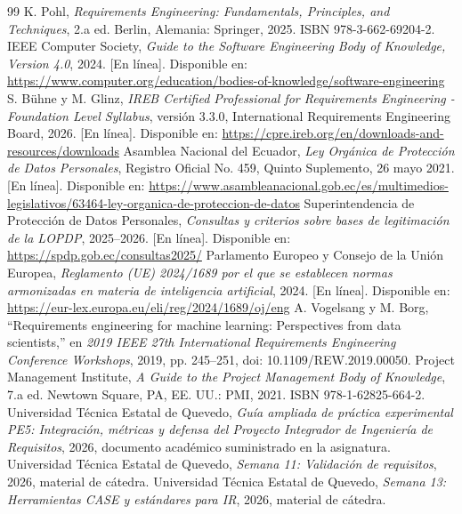 \documentclass[11pt,a4paper]{article}
\begin{document}
\begin{thebibliography}{99}
 K. Pohl, \emph{Requirements Engineering: Fundamentals, Principles, and Techniques}, 2.a ed. Berlin, Alemania: Springer, 2025. ISBN 978-3-662-69204-2.
 IEEE Computer Society, \emph{Guide to the Software Engineering Body of Knowledge, Version 4.0}, 2024. [En línea]. Disponible en: \url{https://www.computer.org/education/bodies-of-knowledge/software-engineering}
 S. Bühne y M. Glinz, \emph{IREB Certified Professional for Requirements Engineering - Foundation Level Syllabus}, versión 3.3.0, International Requirements Engineering Board, 2026. [En línea]. Disponible en: \url{https://cpre.ireb.org/en/downloads-and-resources/downloads}
 Asamblea Nacional del Ecuador, \emph{Ley Orgánica de Protección de Datos Personales}, Registro Oficial No. 459, Quinto Suplemento, 26 mayo 2021. [En línea]. Disponible en: \url{https://www.asambleanacional.gob.ec/es/multimedios-legislativos/63464-ley-organica-de-proteccion-de-datos}
 Superintendencia de Protección de Datos Personales, \emph{Consultas y criterios sobre bases de legitimación de la LOPDP}, 2025--2026. [En línea]. Disponible en: \url{https://spdp.gob.ec/consultas2025/}
 Parlamento Europeo y Consejo de la Unión Europea, \emph{Reglamento (UE) 2024/1689 por el que se establecen normas armonizadas en materia de inteligencia artificial}, 2024. [En línea]. Disponible en: \url{https://eur-lex.europa.eu/eli/reg/2024/1689/oj/eng}
 A. Vogelsang y M. Borg, “Requirements engineering for machine learning: Perspectives from data scientists,” en \emph{2019 IEEE 27th International Requirements Engineering Conference Workshops}, 2019, pp. 245--251, doi: 10.1109/REW.2019.00050.
 Project Management Institute, \emph{A Guide to the Project Management Body of Knowledge}, 7.a ed. Newtown Square, PA, EE. UU.: PMI, 2021. ISBN 978-1-62825-664-2.
 Universidad Técnica Estatal de Quevedo, \emph{Guía ampliada de práctica experimental PE5: Integración, métricas y defensa del Proyecto Integrador de Ingeniería de Requisitos}, 2026, documento académico suministrado en la asignatura.
 Universidad Técnica Estatal de Quevedo, \emph{Semana 11: Validación de requisitos}, 2026, material de cátedra.
 Universidad Técnica Estatal de Quevedo, \emph{Semana 13: Herramientas CASE y estándares para IR}, 2026, material de cátedra.
\end{thebibliography}
\end{document}
